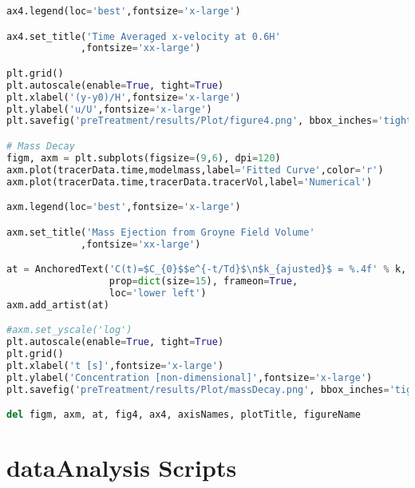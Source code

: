 \documentclass[../main.tex]{subfiles}
\begin{document}
\begin{lstlisting}[language=python]
ax4.legend(loc='best',fontsize='x-large')

ax4.set_title('Time Averaged x-velocity at 0.6H'
             ,fontsize='xx-large')

plt.grid()
plt.autoscale(enable=True, tight=True)
plt.xlabel('(y-y0)/H',fontsize='x-large')
plt.ylabel('u/U',fontsize='x-large')
plt.savefig('preTreatment/results/Plot/figure4.png', bbox_inches='tight')

# Mass Decay
figm, axm = plt.subplots(figsize=(9,6), dpi=120)
axm.plot(tracerData.time,modelmass,label='Fitted Curve',color='r')
axm.plot(tracerData.time,tracerData.tracerVol,label='Numerical')

axm.legend(loc='best',fontsize='x-large')

axm.set_title('Mass Ejection from Groyne Field Volume'
             ,fontsize='xx-large')

at = AnchoredText('C(t)=$C_{0}$$e^{-t/Td}$\n$k_{ajusted}$ = %.4f' % k,
                  prop=dict(size=15), frameon=True,
                  loc='lower left')
axm.add_artist(at)

#axm.set_yscale('log')
plt.autoscale(enable=True, tight=True)
plt.grid()
plt.xlabel('t [s]',fontsize='x-large')
plt.ylabel('Concentration [non-dimensional]',fontsize='x-large')
plt.savefig('preTreatment/results/Plot/massDecay.png', bbox_inches='tight')

del figm, axm, at, fig4, ax4, axisNames, plotTitle, figureName

\end{lstlisting}
\section{dataAnalysis Scripts}
\end{document}
